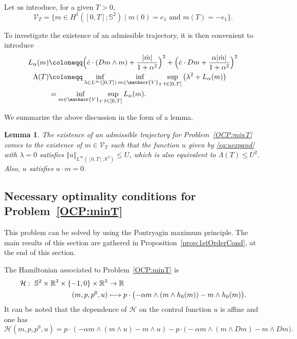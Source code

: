 \documentclass[JEP,XML,SOM,Unicode,NoEqCountersInSection,NoFloatCountersInSection,published]{cedram}
\newcommand\mto{\mathchoice{\longmapsto}{\mapsto}{\mapsto}{\mapsto}}
\newtheorem{lemma}[theorem]{Lemma}
\theoremstyle{definition}
\newcommand{\R} {\mathbb{R}}
\begin{document}
Let us introduce, for a given $T>0$,
\[
\mathscr{V}_T=\{m\in H^1([0,T];\mathbb{S}^2)\mid m(0)=e_1\text{ and }m(T)=-e_1\}.
\]

To investigate the existence of an admissible trajectory, it is then convenient to introduce
\begin{align}\label{ob:aux}
L_\alpha(m) &\coloneqq \Bigl(\dot e\cdot (Dm\wedge m)+\frac{|\dot m|}{1+\alpha^2}\Bigr)^2+\Bigl(\dot e\cdot Dm+\frac{\alpha|\dot m|}{1+\alpha^2}\Bigr)^2\\
\Lambda(T)&\coloneqq \inf_{\lambda\in L^\infty([0,T])}\inf_{m\in \mathscr{V}_T}\sup_{t\in [0,T]}\left(\lambda^2+L_\alpha(m) \right)\nonumber \\
&= \inf_{m\in \mathscr{V}_T}\sup_{t\in [0,T]}L_\alpha(m).
\end{align}

We summarize the above discussion in the form of a lemma.

\begin{lemma}\label{lem:2057}
The existence of an admissible trajectory for Problem~\eqref{OCP:minT} comes to the existence of $m\in \mathscr{V}_T$ such that the function $u$ given by \eqref{eq:uexpand} with $\lambda =0$ satisfies $\Vert u\Vert_{L^\infty([0,T];\mathbb{R}^3)}\leq U $, which is also equivalent to $\Lambda(T)\leq U ^2$. Also, $u$ satisfies $u \cdot m=0$.
\end{lemma}

\subsection{Necessary optimality conditions for Problem~\texorpdfstring{\eqref{OCP:minT}}{P0}}\label{optCond:PMP}
This problem can be solved by using the Pontryagin maximum principle.
The main results of this section are gathered in Proposition~\ref{prop:1stOrderCond}, at the end of this section.

The Hamiltonian associated to Problem~\eqref{OCP:minT} is
\begin{align*}
\mathcal{H}:\
\mathbb{S}^2 \times \R^3\times \{-1,0\}\times \R^3 & \to \R\\
(m,p,p^0,u) &\mto p\cdot \bigl(- \alpha m \wedge (m \wedge h_0(m)) -m\wedge h_0(m)\bigr).
\end{align*}
It can be noted that the dependence of $\mathcal{H}$ on the control function $u$ is affine and one has
\[
\mathcal{H} (m,p,p^0,u)=p\cdot \left(- \alpha m \wedge (m \wedge u) - m \wedge u \right)-p\cdot \bigl(- \alpha m \wedge (m \wedge Dm)-m\wedge Dm\bigr).
\]
\end{document}
